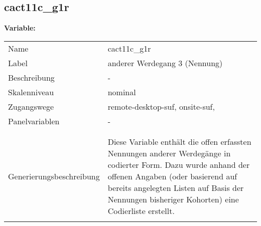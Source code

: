 	
	
	\subsection{cact11c\_g1r}
	\label{subSection:cact11c_g1r}

	\noindent\textbf{Variable:}\\
		\begin{tabular}{lL{11.3cm}}
			\label{tableVariable:cact11c_g1r}
			Name & cact11c\_g1r \\
			Label & anderer Werdegang 3 (Nennung)  \\
			Beschreibung & - \\
			Skalenniveau & nominal \\
			Zugangswege &
				remote-desktop-suf,
				onsite-suf,
 \\
			Panelvariablen & -
			 \\
			 \\
 \\
					Generierungsbeschreibung & Diese Variable enthält die offen erfassten Nennungen anderer Werdegänge in codierter Form. Dazu wurde anhand der offenen Angaben (oder basierend auf bereits angelegten Listen auf Basis der Nennungen bisheriger Kohorten) eine Codierliste erstellt.
				 \\	
			 \\
		\end{tabular}






